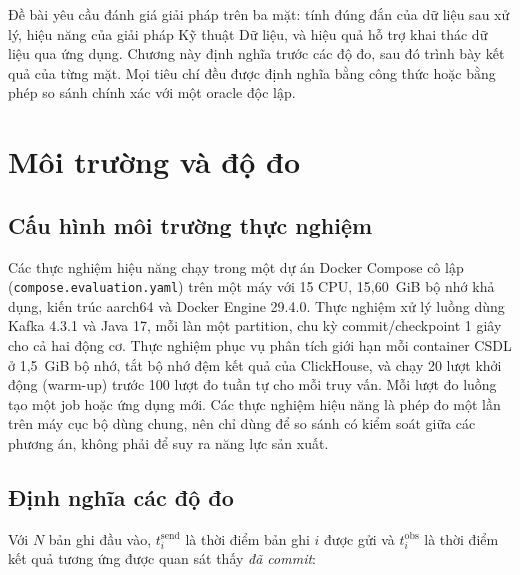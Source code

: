 
Đề bài yêu cầu đánh giá giải pháp trên ba mặt: tính đúng đắn của dữ liệu sau xử lý, hiệu năng của giải pháp Kỹ thuật Dữ liệu, và hiệu quả hỗ trợ khai thác dữ liệu qua ứng dụng. Chương này định nghĩa trước các độ đo, sau đó trình bày kết quả của từng mặt. Mọi tiêu chí đều được định nghĩa bằng công thức hoặc bằng phép so sánh chính xác với một oracle độc lập.

\section{Môi trường và độ đo}
\label{sec:c5-moi-truong}

\subsection{Cấu hình môi trường thực nghiệm}
\label{sec:c5-cau-hinh}
Các thực nghiệm hiệu năng chạy trong một dự án Docker Compose cô lập (\texttt{compose.evaluation.yaml}) trên một máy với 15 CPU, 15,60~GiB bộ nhớ khả dụng, kiến trúc aarch64 và Docker Engine 29.4.0. Thực nghiệm xử lý luồng dùng Kafka 4.3.1 và Java 17, mỗi làn một partition, chu kỳ commit/checkpoint 1 giây cho cả hai động cơ. Thực nghiệm phục vụ phân tích giới hạn mỗi container CSDL ở 1,5~GiB bộ nhớ, tắt bộ nhớ đệm kết quả của ClickHouse, và chạy 20 lượt khởi động (warm-up) trước 100 lượt đo tuần tự cho mỗi truy vấn. Mỗi lượt đo luồng tạo một job hoặc ứng dụng mới. Các thực nghiệm hiệu năng là phép đo một lần trên máy cục bộ dùng chung, nên chỉ dùng để so sánh có kiểm soát giữa các phương án, không phải để suy ra năng lực sản xuất.

\subsection{Định nghĩa các độ đo}
\label{sec:c5-do-do}
Với $N$ bản ghi đầu vào, $t^{\mathrm{send}}_i$ là thời điểm bản ghi $i$ được gửi và $t^{\mathrm{obs}}_i$ là thời điểm kết quả tương ứng được quan sát thấy \emph{đã commit}:

